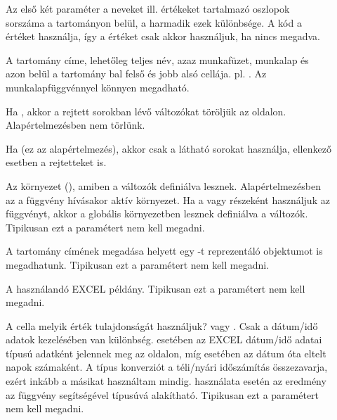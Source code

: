 \begin{description}
\item[] Az első két paraméter a neveket
  ill. értékeket tartalmazó oszlopok sorszáma a tartományon belül, a
  harmadik ezek különbsége. A kód a  értéket 
  használja, így a  értéket csak akkor használjuk, ha
   nincs megadva. 
\item[] A tartomány címe, lehetőleg teljes név, azaz
  munkafüzet, munkalap és azon belül a tartomány bal felső és jobb
  alsó cellája. pl. . Az  
  munkalapfüggvénnyel könnyen megadható.
\item[] Ha , akkor a rejtett sorokban lévő
  változókat töröljük az  oldalon. Alapértelmezésben nem törlünk.
\item[] Ha  (ez az alapértelmezés), akkor
  csak a látható sorokat használja, ellenkező esetben a rejtetteket
  is. 
\item[] Az környezet (), amiben a változók
  definiálva lesznek. Alapértelmezésben az a függvény hívásakor aktív
  környezet. Ha a  vagy 
  részeként használjuk az  függvényt, akkor a globális
   környezetben lesznek definiálva a
  változók. Tipikusan ezt a paramétert nem kell megadni. 
\item[] A tartomány címének megadása helyett egy 
  -t reprezentáló  objektumot is
  megadhatunk. Tipikusan ezt a paramétert nem kell megadni.
\item[] A használandó EXCEL példány. Tipikusan ezt a
  paramétert nem kell megadni. 
\item[] A cella melyik érték tulajdonságát használjuk?
   vagy . Csak a dátum/idő adatok
  kezelésében van különbség.   esetében az EXCEL dátum/idő adatai
   típusú adatként  jelennek meg az  oldalon, míg
   esetében az 
  dátum óta eltelt napok számaként. A  típus konverziót a
  téli/nyári időszámítás  
  összezavarja, ezért inkább a másikat használtam mindig. 
  használata esetén az 
  eredmény az  függvény segítségével  típusúvá
  alakítható. Tipikusan ezt a 
  paramétert nem kell megadni. 
\end{description}

